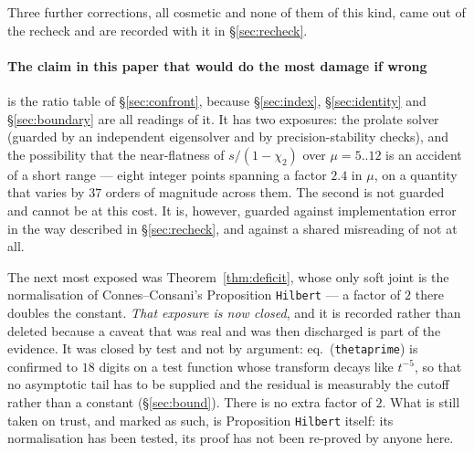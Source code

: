 \documentclass[11pt,a4paper]{article}
\theoremstyle{plain}
\theoremstyle{definition}
\theoremstyle{remark}
\begin{document}
\noindent Three further corrections, all cosmetic and none of them of this kind,
came out of the recheck and are recorded with it in \S\ref{sec:recheck}.

\paragraph{The claim in this paper that would do the most damage if wrong} is the
ratio table of \S\ref{sec:confront}, because \S\ref{sec:index},
\S\ref{sec:identity} and \S\ref{sec:boundary} are all readings of it.  It has two
exposures: the prolate solver (guarded by an independent eigensolver and by
precision-stability checks), and the possibility that the near-flatness of
$s/(1-\chi_2)$ over $\mu=5..12$ is an accident of a short range --- eight integer
points spanning a factor $2.4$ in $\mu$, on a quantity that varies by $37$ orders
of magnitude across them.  The second is not guarded and cannot be at this cost.
It is, however, guarded against implementation error in the way described in
\S\ref{sec:recheck}, and against a shared misreading of \cite{CC2023} not at all.

The next most exposed was Theorem~\ref{thm:deficit}, whose only soft joint is the
normalisation of Connes--Consani's Proposition \texttt{Hilbert} --- a factor of
$2$ there doubles the constant.  \emph{That exposure is now closed}, and it is
recorded rather than deleted because a caveat that was real and was then
discharged is part of the evidence.  It was closed by test and not by argument:
eq.\ (\texttt{thetaprime}) is confirmed to $18$ digits on a test function whose
transform decays like $t^{-5}$, so that no asymptotic tail has to be supplied and
the residual is measurably the cutoff rather than a constant
(\S\ref{sec:bound}).  There is no extra factor of $2$.  What is still taken on
trust, and marked as such, is Proposition \texttt{Hilbert} itself: its
normalisation has been tested, its proof has not been re-proved by anyone here.
\end{document}
